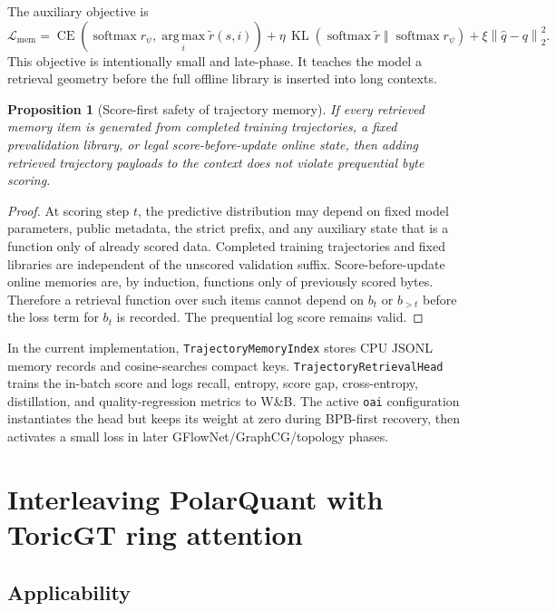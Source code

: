 \documentclass[11pt]{article}
\theoremstyle{definition}
\theoremstyle{plain}
\newtheorem{proposition}[definition]{Proposition}
\theoremstyle{remark}
\numberwithin{equation}{section}
\newcommand{\softmax}{\operatorname{softmax}}
\newcommand{\argmax}{\operatorname*{arg\,max}}
\newcommand{\norm}[1]{\left\lVert #1\right\rVert}
\begin{document}
The auxiliary objective is
\begin{equation}
  \mathcal L_{\mathrm{mem}}
  =\operatorname{CE}\left(\softmax r_\psi,\argmax_i\widetilde r(s,i)\right)
  +\eta\,\operatorname{KL}\left(\softmax\widetilde r\;\Vert\;\softmax r_\psi\right)
  +\xi\norm{\widehat q-q}_2^2.
\end{equation}
This objective is intentionally small and late-phase.  It teaches the model a retrieval geometry before the full offline library is inserted into long contexts.

\begin{proposition}[Score-first safety of trajectory memory]
If every retrieved memory item is generated from completed training trajectories, a fixed prevalidation library, or legal score-before-update online state, then adding retrieved trajectory payloads to the context does not violate prequential byte scoring.
\end{proposition}

\begin{proof}
At scoring step $t$, the predictive distribution may depend on fixed model parameters, public metadata, the strict prefix, and any auxiliary state that is a function only of already scored data.  Completed training trajectories and fixed libraries are independent of the unscored validation suffix.  Score-before-update online memories are, by induction, functions only of previously scored bytes.  Therefore a retrieval function over such items cannot depend on $b_t$ or $b_{>t}$ before the loss term for $b_t$ is recorded.  The prequential log score remains valid.
\end{proof}

In the current implementation, \texttt{TrajectoryMemoryIndex} stores CPU JSONL memory records and cosine-searches compact keys.  \texttt{TrajectoryRetrievalHead} trains the in-batch score and logs recall, entropy, score gap, cross-entropy, distillation, and quality-regression metrics to W\&B.  The active \texttt{oai} configuration instantiates the head but keeps its weight at zero during BPB-first recovery, then activates a small loss in later GFlowNet/GraphCG/topology phases.

\section{Interleaving PolarQuant with ToricGT ring attention}

\subsection{Applicability}
\end{document}
